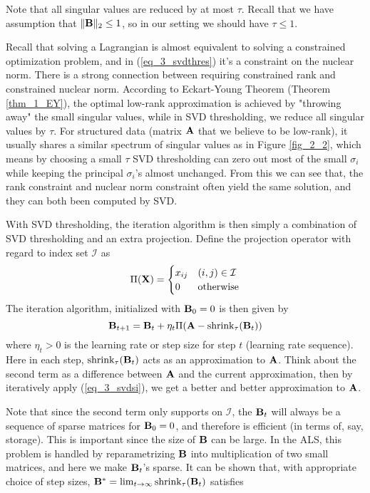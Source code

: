 \documentclass[../book-template.tex]{subfiles}
\begin{document}
Note that all singular values are reduced by at most $\tau$. Recall that we have assumption that $\|{\bf B}\|_2\leq 1$, so in our setting we should have $\tau \leq 1$.
\par Recall that solving a Lagrangian is almost equivalent to solving a constrained optimization problem, and in (\ref{eq_3_svdthres}) it's a constraint on the nuclear norm. There is a strong connection between requiring constrained rank and constrained nuclear norm. According to Eckart-Young Theorem (Theorem \ref{thm_1_EY}), the optimal low-rank approximation is achieved by "throwing away" the small singular values, while in SVD thresholding, we reduce all singular values by $\tau$. For structured data (matrix ${\bf A}$ that we believe to be low-rank),  it usually shares a similar spectrum of singular values as in Figure \ref{fig_2_2}, which means by choosing a small $\tau$ SVD thresholding can zero out most of the small $\sigma_i$ while keeping the principal $\sigma_i$'s almost unchanged. From this we can see that, the rank constraint and nuclear norm constraint often yield the same solution, and they can both been computed by SVD.
\par With SVD thresholding, the iteration algorithm is then simply a combination of SVD thresholding and an extra projection. Define the projection operator with regard to index set $\mathcal{I}$ as
\begin{equation*}
	\Pi({\bf X})=\begin{cases}
	x_{ij} & (i,j)\in \mathcal{I}\\
	0 & \text{otherwise}
	\end{cases}
\end{equation*} 
The iteration algorithm, initialized with ${\bf B}_0=0$ is then given by
\begin{equation}\label{eq_3_svdsi}
	{\bf B}_{t+1} = {\bf B}_t + \eta_t\Pi({\bf A}-\text{shrink}_{\tau}({\bf B}_t))
\end{equation}
where $\eta_t>0$ is the learning rate or step size for step $t$ (learning rate sequence). Here in each step, $\text{shrink}_{\tau}({\bf B}_t)$ acts as an approximation to ${\bf A}$. Think about the second term as a difference between ${\bf A}$ and the current approximation, then by iteratively apply (\ref{eq_3_svdsi}), we get a better and better approximation to ${\bf A}$. 
\par Note that since the second term only supports on $\mathcal{I}$, the ${\bf B}_t$ will always be a sequence of sparse matrices for ${\bf B}_0=0$, and therefore is efficient (in terms of, say, storage). This is important since the size of ${\bf B}$ can be large. In the ALS, this problem is handled by reparametrizing ${\bf B}$ into multiplication of two small matrices, and here we make ${\bf B}_t$'s sparse. It can be shown that, with appropriate choice of step sizes, ${\bf B}^* = \lim_{t\rightarrow\infty}\text{shrink}_{\tau}({\bf B}_t)$ satisfies
\end{document}
